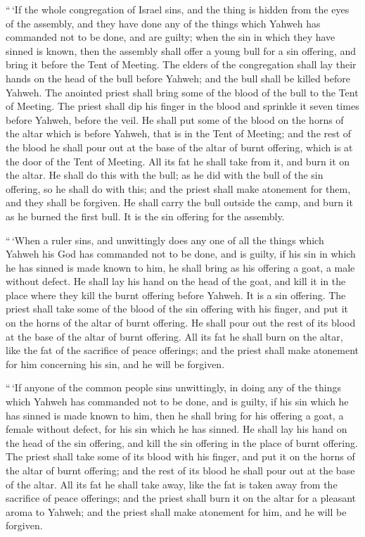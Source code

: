  ``\,`If the whole congregation of Israel sins, and the
thing is hidden from the eyes of the assembly, and they have done any of
the things which Yahweh has commanded not to be done, and are guilty;
 when the sin in which they have sinned is known, then the
assembly shall offer a young bull for a sin offering, and bring it
before the Tent of Meeting.  The elders of the congregation
shall lay their hands on the head of the bull before Yahweh; and the
bull shall be killed before Yahweh.  The anointed priest
shall bring some of the blood of the bull to the Tent of Meeting.
 The priest shall dip his finger in the blood and sprinkle
it seven times before Yahweh, before the veil.  He shall
put some of the blood on the horns of the altar which is before Yahweh,
that is in the Tent of Meeting; and the rest of the blood he shall pour
out at the base of the altar of burnt offering, which is at the door of
the Tent of Meeting.  All its fat he shall take from it,
and burn it on the altar.  He shall do this with the bull;
as he did with the bull of the sin offering, so he shall do with this;
and the priest shall make atonement for them, and they shall be
forgiven.  He shall carry the bull outside the camp, and
burn it as he burned the first bull. It is the sin offering for the
assembly.

 ``\,`When a ruler sins, and unwittingly does any one of
all the things which Yahweh his God has commanded not to be done, and is
guilty,  if his sin in which he has sinned is made known to
him, he shall bring as his offering a goat, a male without defect.
 He shall lay his hand on the head of the goat, and kill it
in the place where they kill the burnt offering before Yahweh. It is a
sin offering.  The priest shall take some of the blood of
the sin offering with his finger, and put it on the horns of the altar
of burnt offering. He shall pour out the rest of its blood at the base
of the altar of burnt offering.  All its fat he shall burn
on the altar, like the fat of the sacrifice of peace offerings; and the
priest shall make atonement for him concerning his sin, and he will be
forgiven.

 ``\,`If anyone of the common people sins unwittingly, in
doing any of the things which Yahweh has commanded not to be done, and
is guilty,  if his sin which he has sinned is made known to
him, then he shall bring for his offering a goat, a female without
defect, for his sin which he has sinned.  He shall lay his
hand on the head of the sin offering, and kill the sin offering in the
place of burnt offering.  The priest shall take some of its
blood with his finger, and put it on the horns of the altar of burnt
offering; and the rest of its blood he shall pour out at the base of the
altar.  All its fat he shall take away, like the fat is
taken away from the sacrifice of peace offerings; and the priest shall
burn it on the altar for a pleasant aroma to Yahweh; and the priest
shall make atonement for him, and he will be forgiven.

